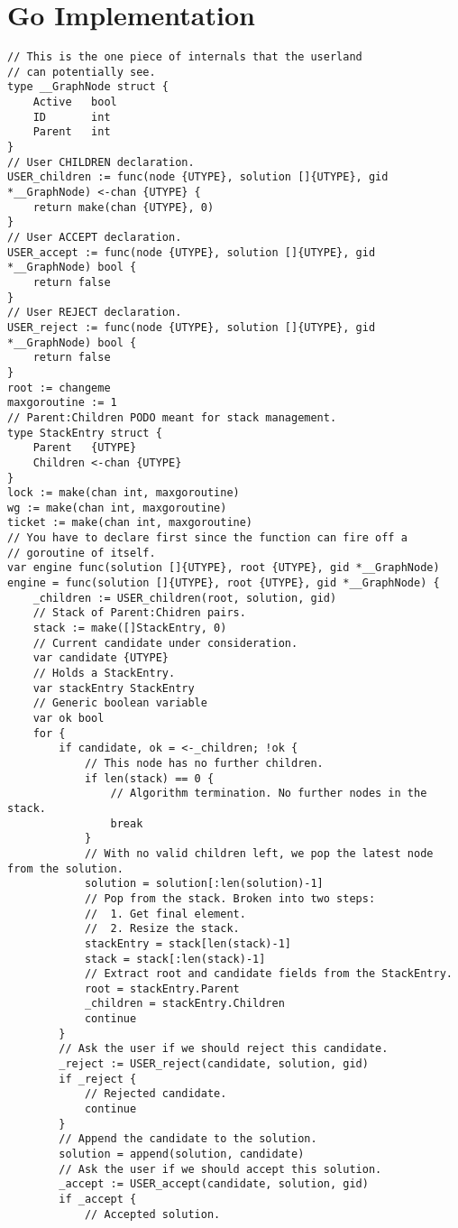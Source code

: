 \documentclass[runningheads]{llncs}
\begin{document}
\section{Go Implementation}
\begin{lstlisting}[language=Golang, style=boxed]
// This is the one piece of internals that the userland
// can potentially see.
type __GraphNode struct {
	Active	 bool
	ID       int
	Parent   int
}
// User CHILDREN declaration.
USER_children := func(node {UTYPE}, solution []{UTYPE}, gid *__GraphNode) <-chan {UTYPE} {
	return make(chan {UTYPE}, 0)
}
// User ACCEPT declaration.
USER_accept := func(node {UTYPE}, solution []{UTYPE}, gid *__GraphNode) bool {
	return false
}
// User REJECT declaration.
USER_reject := func(node {UTYPE}, solution []{UTYPE}, gid *__GraphNode) bool {
	return false
}
root := changeme
maxgoroutine := 1
// Parent:Children PODO meant for stack management.
type StackEntry struct {
	Parent   {UTYPE}
	Children <-chan {UTYPE}
}
lock := make(chan int, maxgoroutine)
wg := make(chan int, maxgoroutine)
ticket := make(chan int, maxgoroutine)
// You have to declare first since the function can fire off a
// goroutine of itself.
var engine func(solution []{UTYPE}, root {UTYPE}, gid *__GraphNode)
engine = func(solution []{UTYPE}, root {UTYPE}, gid *__GraphNode) {
	_children := USER_children(root, solution, gid)
	// Stack of Parent:Chidren pairs.
	stack := make([]StackEntry, 0)
	// Current candidate under consideration.
	var candidate {UTYPE}
	// Holds a StackEntry.
	var stackEntry StackEntry
	// Generic boolean variable
	var ok bool
	for {
		if candidate, ok = <-_children; !ok {
			// This node has no further children.
			if len(stack) == 0 {
				// Algorithm termination. No further nodes in the stack.
				break
			}
			// With no valid children left, we pop the latest node from the solution.
			solution = solution[:len(solution)-1]
			// Pop from the stack. Broken into two steps:
			// 	1. Get final element.
			//	2. Resize the stack.
			stackEntry = stack[len(stack)-1]
			stack = stack[:len(stack)-1]
			// Extract root and candidate fields from the StackEntry.
			root = stackEntry.Parent
			_children = stackEntry.Children
			continue
		}
		// Ask the user if we should reject this candidate.
		_reject := USER_reject(candidate, solution, gid)
		if _reject {
			// Rejected candidate.
			continue
		}
		// Append the candidate to the solution.
		solution = append(solution, candidate)
		// Ask the user if we should accept this solution.
		_accept := USER_accept(candidate, solution, gid)
		if _accept {
			// Accepted solution.

\end{lstlisting}
\end{document}
